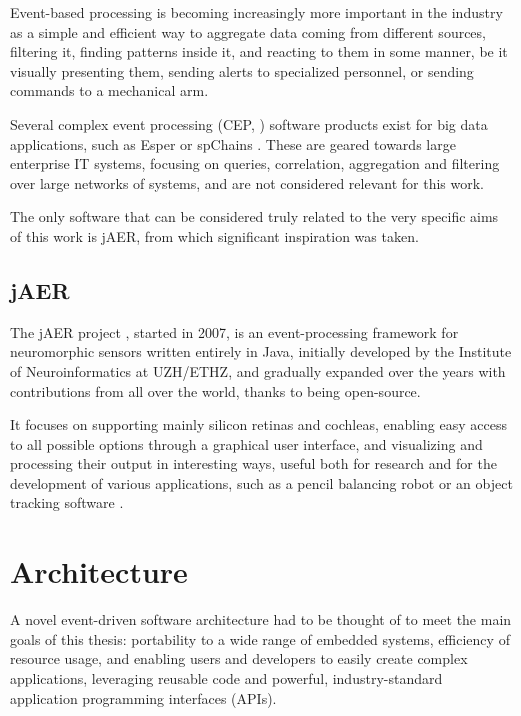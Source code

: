\documentclass[a4paper,12pt]{report}
\begin{document}
Event-based processing is becoming increasingly more important in the industry as a simple and efficient way to aggregate data coming from different sources, filtering it, finding patterns inside it, and reacting to them in some manner, be it visually presenting them, sending alerts to specialized personnel, or sending commands to a mechanical arm.

Several complex event processing (CEP, \cite{cep_thesis}) software products exist for big data applications, such as Esper \cite{cep_thesis} or spChains \cite{spchains}. These are geared towards large enterprise IT systems, focusing on queries, correlation, aggregation and filtering over large networks of systems, and are not considered relevant for this work.

The only software that can be considered truly related to the very specific aims of this work is jAER, from which significant inspiration was taken.

\section{jAER} \label{sec:jaer}

The jAER project \cite{jaer_project}, started in 2007, is an event-processing framework for neuromorphic sensors written entirely in Java, initially developed by the Institute of Neuroinformatics at UZH/ETHZ, and gradually expanded over the years with contributions from all over the world, thanks to being open-source.

It focuses on supporting mainly silicon retinas and cochleas, enabling easy access to all possible options through a graphical user interface, and visualizing and processing their output in interesting ways, useful both for research and for the development of various applications, such as a pencil balancing robot \cite{pencil_balancer} or an object tracking software \cite{frame_free}.

\chapter{Architecture} \label{chap:architecture}

A novel event-driven software architecture had to be thought of to meet the main goals of this thesis: portability to a wide range of embedded systems, efficiency of resource usage, and enabling users and developers to easily create complex applications, leveraging reusable code and powerful, industry-standard application programming interfaces (APIs).
\end{document}
